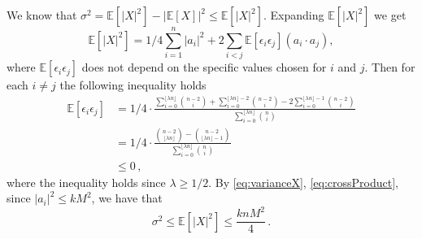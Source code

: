 \documentclass[a4paper]{amsart}
\theoremstyle{plain}
\begin{document}
We know that $\sigma^2 = \mathbb{E}[|X|^2] - |\mathbb{E}[X]|^2 \leq \mathbb{E}[|X|^2]$. Expanding $\mathbb{E}[|X|^2]$ we get
\begin{equation}\label{eq:varianceX}
\mathbb{E}[|X|^2] = 1/4 \sum_{i=1}^n |a_i|^2 + 2 \sum_{i < j} \mathbb{E}[\epsilon_i \epsilon_j] (a_i \cdot a_j),
\end{equation}
where $\mathbb{E}[\epsilon_i \epsilon_j]$ does not depend on the specific values chosen for $i$ and $j$. Then for each $i \neq j$ the following inequality holds
\begin{align}\label{eq:crossProduct}
\mathbb{E}[\epsilon_i \epsilon_j] &= 1/4 \cdot \frac{\sum_{i=0}^{\lfloor \lambda n \rfloor} \binom{n-2}{i} + \sum_{i=0}^{\lfloor \lambda n \rfloor - 2} \binom{n-2}{i} - 2 \sum_{i=0}^{\lfloor \lambda n \rfloor -1} \binom{n-2}{i}}{\sum_{i=0}^{\lfloor \lambda n \rfloor} \binom{n}{i}} \nonumber \\
& = 1/4 \cdot \frac{\binom{n-2}{ \lfloor \lambda n \rfloor} - \binom{n-2}{\lfloor \lambda n \rfloor - 1}}{\sum_{i=0}^{\lfloor \lambda n \rfloor} \binom{n}{i}} \nonumber \\
& \leq 0\,,
\end{align}
where the inequality holds since $\lambda \geq 1/2$.
By \eqref{eq:varianceX}, \eqref{eq:crossProduct}, since $|a_i|^2 \leq k M^2$, we have that
\begin{equation}\label{eq:upperSigma}
\sigma^2 \leq \mathbb{E}[|X|^2] \leq \frac{k n M^2}{4}\,.
\end{equation}
\end{document}
